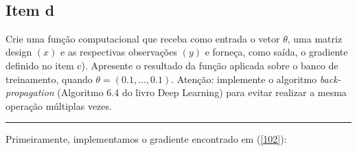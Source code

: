 \documentclass[
  a4paperpaper,
]{article}
\begin{document}
~

\subsection{Item d}\label{item-d}

Crie uma função computacional que receba como entrada o vetor
\(\theta\), uma matriz design \((x)\) e as respectivas observações
\((y)\) e forneça, como saída, o gradiente definido no item c).
Apresente o resultado da função aplicada sobre o banco de treinamento,
quando \(\theta = (0.1, \dots , 0.1)\). Atenção: implemente o algoritmo
\emph{back-propagation} (Algoritmo 6.4 do livro Deep Learning) para
evitar realizar a mesma operação múltiplas vezes.

\begin{center}\rule{0.5\linewidth}{0.5pt}\end{center}

Primeiramente, implementamos o gradiente encontrado em (\ref{102}):
\end{document}
